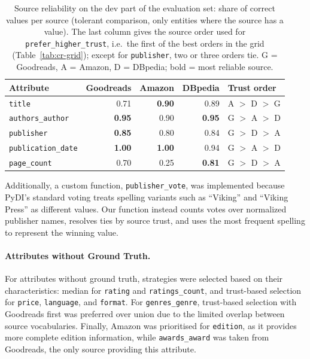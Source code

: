 \documentclass[runningheads]{llncs}
\begin{document}
\begin{table}[h]
\caption{Source reliability on the dev part of the evaluation set: share of correct values per source (tolerant comparison, only entities where the source has a value). The last column gives the source order used for \texttt{prefer\_higher\_trust}, i.e.\ the first of the best orders in the grid (Table~\ref{tab:cr-grid}); except for \texttt{publisher}, two or three orders tie. G = Goodreads, A = Amazon, D = DBpedia; bold = most reliable source.}
\label{tab:source_ranking}
\centering
\footnotesize
\setlength{\tabcolsep}{6pt}
\begin{tabular}{lrrrl}
\toprule
Attribute & Goodreads & Amazon & DBpedia & Trust order \\
\midrule
\texttt{title}             & 0.71 & \textbf{0.90} & 0.89 & A $>$ D $>$ G \\
\texttt{authors\_author}   & \textbf{0.95} & 0.90 & \textbf{0.95} & G $>$ A $>$ D \\
\texttt{publisher}         & \textbf{0.85} & 0.80 & 0.84 & G $>$ D $>$ A \\
\texttt{publication\_date} & \textbf{1.00} & \textbf{1.00} & 0.94 & G $>$ A $>$ D \\
\texttt{page\_count}       & 0.70 & 0.25 & \textbf{0.81} & G $>$ D $>$ A \\
\bottomrule
\end{tabular}
\end{table}

Additionally, a custom function, \texttt{publisher\_vote}, was implemented because PyDI's standard voting treats spelling variants such as ``Viking'' and ``Viking Press'' as different values. Our function instead counts votes over normalized publisher names, resolves ties by source trust, and uses the most frequent spelling to represent the winning value.

\paragraph{Attributes without Ground Truth.}
For attributes without ground truth, strategies were selected based on their characteristics: median for \texttt{rating} and \texttt{ratings\_count}, and trust-based selection for \texttt{price}, \texttt{language}, and \texttt{format}. For \texttt{genres\_genre}, trust-based selection with Goodreads first was preferred over union due to the limited overlap between source vocabularies. Finally, Amazon was prioritised for \texttt{edition}, as it provides more complete edition information, while \texttt{awards\_award} was taken from Goodreads, the only source providing this attribute.
\end{document}
